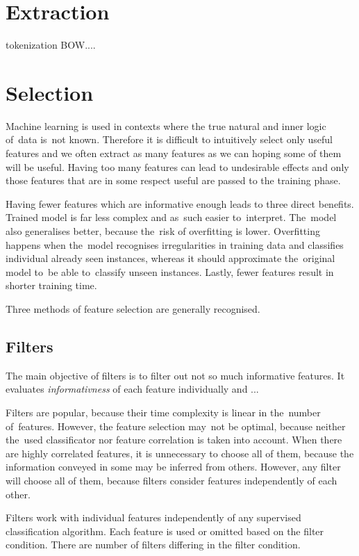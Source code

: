 \section{Extraction}

tokenization
BOW....




\section{Selection}

Machine learning is used in contexts where the true natural and inner logic of~data is~not known.
Therefore it is difficult to intuitively select only useful features and we often extract as many features as we can hoping some of them will be useful.
Having too many features can lead to undesirable effects and only those features that are in some respect useful are passed to the training phase.

Having fewer features which are informative enough leads to three direct benefits.
Trained model is far less complex and as~such easier to~interpret.
The~model also generalises better, because the~risk of overfitting is lower.
Overfitting happens when the~model recognises irregularities in training data and classifies individual already seen instances, whereas it should approximate the~original model to~be able to~classify unseen instances.
Lastly, fewer features result in shorter training time.

Three methods of feature selection are generally recognised.


\subsection{Filters}

The main objective of filters is to filter out not so much informative features. It evaluates {\it informativness} of each feature individually and ...

Filters are popular, because their time complexity is linear in the~number of~features. However, the feature selection may~not be optimal, because neither the~used classificator nor feature correlation is taken into account. When there are highly correlated features, it is unnecessary to choose all of them, because the information conveyed in some may be inferred from others. However, any filter will choose all of them, because filters consider features independently of each other.

Filters work with individual features independently of any supervised classification algorithm. Each feature is used or omitted based on the filter condition. There are number of filters differing in the filter condition.

